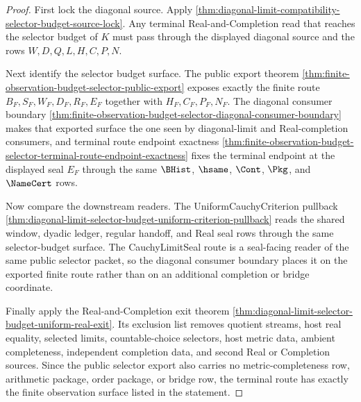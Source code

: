 \begin{proof}
First lock the diagonal source. Apply \autoref{thm:diagonal-limit-compatibility-selector-budget-source-lock}. Any terminal Real-and-Completion read that reaches the selector budget of $K$ must pass through the displayed diagonal source and the rows $W,D,Q,L,H,C,P,N$.

Next identify the selector budget surface. The public export theorem \autoref{thm:finite-observation-budget-selector-public-export} exposes exactly the finite route $B_F,S_F,W_F,D_F,R_F,E_F$ together with $H_F,C_F,P_F,N_F$. The diagonal consumer boundary \autoref{thm:finite-observation-budget-selector-diagonal-consumer-boundary} makes that exported surface the one seen by diagonal-limit and Real-completion consumers, and terminal route endpoint exactness \autoref{thm:finite-observation-budget-selector-terminal-route-endpoint-exactness} fixes the terminal endpoint at the displayed seal $E_F$ through the same $\BHist$, $\hsame$, $\Cont$, $\Pkg$, and $\NameCert$ rows.

Now compare the downstream readers. The UniformCauchyCriterion pullback \autoref{thm:diagonal-limit-selector-budget-uniform-criterion-pullback} reads the shared window, dyadic ledger, regular handoff, and Real seal rows through the same selector-budget surface. The CauchyLimitSeal route is a seal-facing reader of the same public selector packet, so the diagonal consumer boundary places it on the exported finite route rather than on an additional completion or bridge coordinate.

Finally apply the Real-and-Completion exit theorem \autoref{thm:diagonal-limit-selector-budget-uniform-real-exit}. Its exclusion list removes quotient streams, host real equality, selected limits, countable-choice selectors, host metric data, ambient completeness, independent completion data, and second Real or Completion sources. Since the public selector export also carries no metric-completeness row, arithmetic package, order package, or bridge row, the terminal route has exactly the finite observation surface listed in the statement.
\end{proof}


